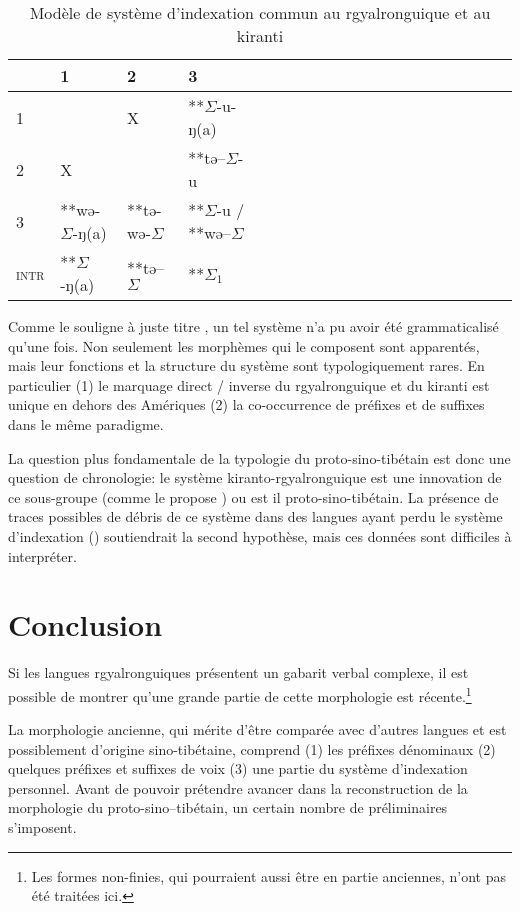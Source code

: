 \documentclass[oldfontcommands,oneside,a4paper,11pt]{article}
\newcommand{\ipa}[1]{{\phon \mbox{#1}}} %
\newcommand{\grise}[1]{\cellcolor{lightgray}\textbf{#1}}
\newcommand{\ra}{$\Sigma_1$}
\newcommand{\ro}{$\Sigma$}
\begin{document}
 

\begin{table}[H]
\caption{Modèle de système d'indexation commun au rgyalronguique et au kiranti} \centering \label{tab:commun}
\begin{tabular}{l|lllllllllllllllllll}
\toprule
&1 & 2 &3 &\\
\midrule
1 &\grise{}& X& **\ro{}-\ipa{u-ŋ(a)}	 \\
2 &X &\grise{} & **\ipa{tə--}\ro{}-\ipa{u}\\
3 &**\ipa{wə-}\ro{}-\ipa{ŋ(a)}&**\ipa{tə-wə-}\ro{}& **\ro{}-\ipa{u} / **\ipa{wə}--\ro{} \\
\midrule
\textsc{intr} & **\ro{}-\ipa{ŋ(a)}&**\ipa{tə--}\ro{}&**\ra{} \\
\bottomrule
\end{tabular}
\end{table}
 
 Comme le souligne à juste titre \citet{delancey14second}, un tel système n'a pu avoir été grammaticalisé qu'une fois. Non seulement les morphèmes qui le composent sont apparentés, mais leur fonctions et la structure du système sont typologiquement  rares. En particulier (1) le marquage direct / inverse du rgyalronguique et du kiranti est unique en dehors des Amériques (2) la co-occurrence de préfixes et de suffixes dans le même paradigme.
 
 La question plus fondamentale de la typologie du proto-sino-tibétain est donc une question de chronologie: le système kiranto-rgyalronguique est une innovation de ce sous-groupe (comme le propose \citeal{lapolla03}) ou est il proto-sino-tibétain. La présence de traces possibles de débris de ce système dans des langues ayant perdu le système d'indexation (\citealt{jacques10zos}) soutiendrait la second hypothèse, mais ces données sont difficiles à interpréter.
 
 
\section{Conclusion}
Si les langues rgyalronguiques présentent un gabarit verbal complexe, il est possible de montrer qu'une grande partie de cette morphologie est récente.\footnote{Les formes non-finies, qui pourraient aussi être en partie anciennes, n'ont pas été traitées ici.}

La morphologie ancienne, qui mérite d'être comparée avec d'autres langues et est possiblement d'origine sino-tibétaine, comprend (1) les préfixes dénominaux (2) quelques préfixes et suffixes de voix (3) une partie du système d'indexation personnel. Avant de pouvoir prétendre avancer dans la reconstruction de la morphologie du proto-sino--tibétain, un certain nombre de préliminaires s'imposent.
\end{document}
